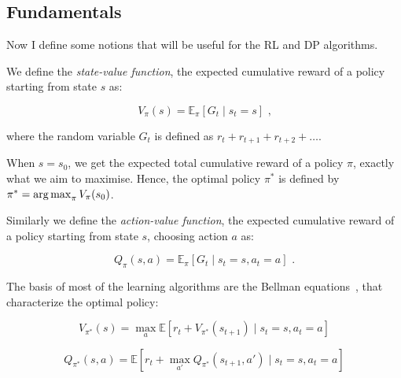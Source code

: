 \subsection{Fundamentals}

Now I define some notions that will be useful for the RL and DP algorithms.


We define the \textit{state-value function}, the expected cumulative reward of a policy starting from state $s$ as:

\begin{equation}\label{eq:statevalueFunction}
V_{\pi}(s)=\mathbb{E}_\pi[G_t \mid s_t = s] \text{ ,}
\end{equation}

where the random variable $G_t$ is defined as $r_{t} +  r_{t+1} + r_{t+2} + \ldots$.

When $s=s_0$, we get the expected total cumulative reward of a policy $\pi$, exactly what we aim to maximise. Hence, the optimal policy $\pi^*$ is defined by $\pi^* = \operatorname*{arg\,max}_{\pi} V_{\pi}(s_0)$.


Similarly we define the \textit{action-value function}, the expected cumulative reward of a policy starting from state $s$, choosing action $a$ as:

\begin{equation}\label{eq:actionvalueFunction}
Q_{\pi}(s, a)=\mathbb{E}_\pi[G_t \mid s_t = s, a_t = a] \text{ .}
\end{equation}


The basis of most of the learning algorithms are the Bellman equations~\cite{bellman1957bellmanequation}, that characterize the optimal policy:


\begin{equation}\label{eq:bellmanState}
V_{\pi^*}(s) = \max_a \mathbb{E} [r_t + V_{\pi^*}(s_{t+1}) \mid s_t=s, a_t=a]
\end{equation}


\begin{equation} \label{eq:bellmanAction}
Q_{\pi^*}(s,a) = \mathbb{E} [r_t + \max_{a'} Q_{\pi^*}(s_{t+1},a') \mid s_t=s, a_t=a ] 
\end{equation}

